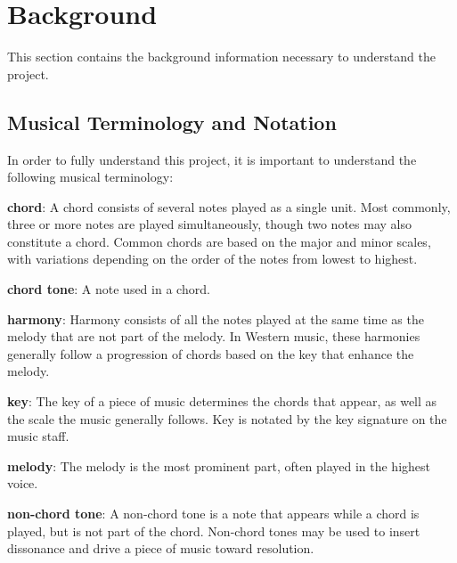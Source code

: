 \chapter{Background} \label{bg}

This section contains the background information necessary to understand the project. %




\section{Musical Terminology and Notation} \label{bg:musicTerminology}

In order to fully understand this project, it is important to understand the following musical terminology:

\textbf{chord}: A chord consists of several notes played as a single unit.
Most commonly, three or more notes are played simultaneously, though two notes may also constitute a chord.
Common chords are based on the major and minor scales, with variations depending on the order of the notes from lowest to highest.

\textbf{chord tone}: A note used in a chord.

\textbf{harmony}: Harmony consists of all the notes played at the same time as the melody that are not part of the melody.
In Western music, these harmonies generally follow a progression of chords based on the key that enhance the melody.

\textbf{key}: The key of a piece of music determines the chords that appear, as well as the scale the music generally follows.
Key is notated by the key signature on the music staff.

\textbf{melody}: The melody is the most prominent part, often played in the highest voice.

\textbf{non-chord tone}: A non-chord tone is a note that appears while a chord is played, but is not part of the chord.
Non-chord tones may be used to insert dissonance and drive a piece of music toward resolution.

